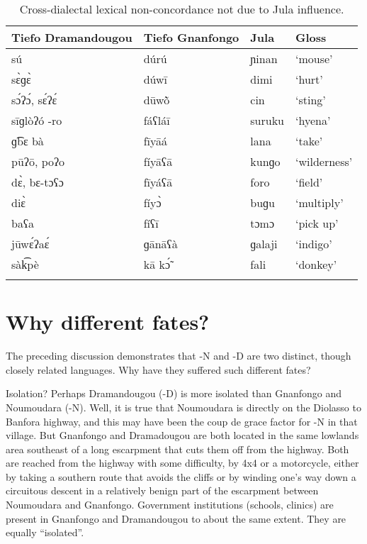 \documentclass[output=paper,
modfonts
]{langscibook}
\begin{document}
\begin{table}
\caption{Cross-dialectal lexical non-concordance not due to Jula influence.}
\label{tab:hangtan:11}
\begin{tabularx}{\textwidth}{llXX}
\lsptoprule
{\bfseries  {Tiefo} Dramandougou} & {\bfseries  {Tiefo} Gnanfongo} & {\bfseries Jula} & {\bfseries Gloss}\\
\midrule 
{ sú} & { dúrú} & { ɲinan} & { ‘mouse’}\\
{ s{\`{ɛ}}ɡ{\`{ɛ}}} & { dúwī} & { dimi} & { ‘hurt’}\\
{ s{\'{ɔ}}ʔ{\'{ɔ}}, s{\'{ɛ}}ʔ{\'{ɛ}}} & { {dūw}\`{õ}} & { cin} & { ‘sting’}\\
{ sīɡlòʔó {}-ro} & { fáʕláī} & { suruku} & { ‘hyena’}\\
{ ɡ͡bɛ bà} & { fīyāá} & { lana} & { ‘take’}\\
{ pūʔ\=o, poʔo} & { fíyāʕā} & { kunɡo} & { ‘wilderness’}\\
{ d{\`{ɛ}}, bɛ-tɔʕɔ} & { fīyáʕā} & { foro} & { ‘field’}\\
{ di{\`{ɛ}}} & { fíy{\`{ɔ}}} & { buɡu} & { ‘multiply’}\\
{ baʕa} & { fíʕī} & { tɔmɔ} & { ‘pick up’}\\
{ jūw{\'{ɛ}}ʔa{\'{ɛ}}} & {ɡānāʕà} & { ɡalaji} & { ‘indigo’}\\
{ sàk͡pè} &  kā k{\'{\~{ɔ}}} & { fali} & { ‘donkey’}\\
\lspbottomrule
\end{tabularx}

\end{table}
\newpage 
\section{Why different fates?}\label{sec:hangtan:5}

The preceding discussion demonstrates that -N and -D are two distinct, though closely related languages. Why have they suffered such different fates?

Isolation? Perhaps Dramandougou (-D) is more isolated than Gnanfongo and Noumoudara (-N). Well, it is true that Noumoudara is directly on the  Diolasso to Banfora highway, and this may have been the coup de grace factor for -N in that village. But Gnanfongo and Dramadougou are both located in the same lowlands area southeast of a long escarpment that cuts them off from the highway. Both are reached from the highway with some difficulty, by 4x4 or a motorcycle, either by taking a southern route that avoids the cliffs or by winding one’s way down a circuitous descent in a relatively benign part of the escarpment between Noumoudara and Gnanfongo. Government institutions (schools, clinics) are present in Gnanfongo and Dramandougou to about the same extent. They are equally ``isolated''.
\end{document}
